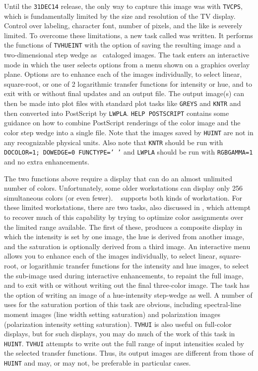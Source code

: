 Until the {\tt 31DEC14} release, the only way to capture this image
was with {\tt TVCPS}, which is fundamentally limited by the size and
resolution of the TV display.  Control over labeling, character font,
number of pixels, and the like is severely limited.  To overcome these
limitations, a new task called {\tt {}} was written.  It
performs the functions of {\tt TVHUEINT} with the option of saving the
resulting image and a two-dimensional step wedge as \AIPS\ cataloged
images.  The task enters an interactive mode in which the user selects
options from a menu shown on a graphics overlay plane.  Options are to
enhance each of the images individually, to select linear,
square-root, or one of 2 logarithmic transfer functions for intensity
or hue, and to exit with or without final updates and an output file.
The output image(s) can then be made into plot files with standard
plot tasks like {\tt GREYS} and {\tt KNTR} and then converted into
PostScript by {\tt LWPLA}\@.  {\tt HELP POSTSCRIPT} contains some
guidance on how to combine PostScript renderings of the color image
and the color step wedge into a single file.  Note that the images
saved by {\tt HUINT} are not in any recognizable physical units.  Also
note that {\tt KNTR} should be run with {\tt DOCOLOR=1; DOWEDGE=0
FUNCTYPE=' '} and {\tt LWPLA} should be run with {\tt RGBGAMMA=1} and
no extra enhancements.

The two functions above require a display that can do an almost
unlimited number of colors.  Unfortunately, some older workstations
can display only 256 simultaneous colors (or even fewer).  {\tt
{}} supports both kinds of workstation.  For these limited
workstations, there are two tasks, also discussed in ,
which attempt to recover much of this capability by trying to optimize
color assignments over the limited range available.  The first of
these, {\tt {}} produces a composite display in which the
intensity is set by one image, the hue is derived from another image,
and the saturation is optionally derived from a third image.  An
interactive menu allows you to enhance each of the images
individually, to select linear, square-root, or logarithmic transfer
functions for the intensity and hue images, to select the sub-image
used during interactive enhancements, to repaint the full image, and
to exit with or without writing out the final three-color image.  The
task has the option of writing an image of a hue-intensity step-wedge
as well.  A number of uses for the saturation portion of this task are
obvious, including spectral-line moment images (line width setting
saturation) and polarization images (polarization intensity setting
saturation).  {\tt TVHUI} is also useful on full-color displays, but
for such displays, you may do much of the work of this task in {\tt
HUINT}\@.  {\tt TVHUI} attempts to write out the full range of input
intensities scaled by the selected transfer functions.  Thus, its
output images are different from those of {\tt HUINT} and may, or may
not, be preferable in particular cases.

